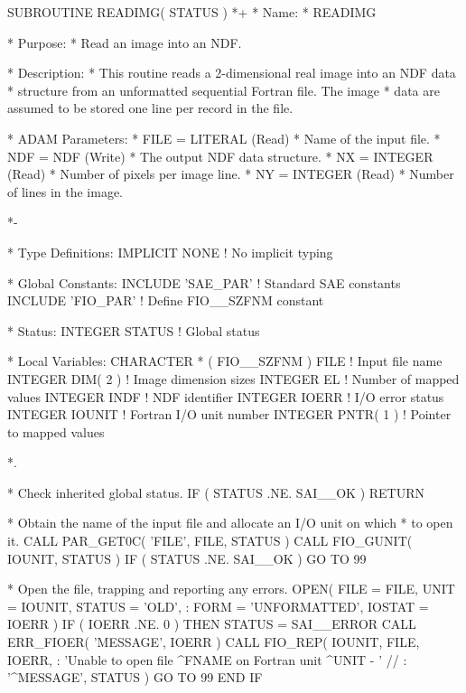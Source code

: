 \documentclass[twoside,11pt,nolof]{starlink}
\begin{document}
\small
\begin{terminalv}
      SUBROUTINE READIMG( STATUS )
*+
*  Name:
*     READIMG

*  Purpose:
*     Read an image into an NDF.

*  Description:
*     This routine reads a 2-dimensional real image into an NDF data
*     structure from an unformatted sequential Fortran file. The image
*     data are assumed to be stored one line per record in the file.

*  ADAM Parameters:
*     FILE = LITERAL (Read)
*        Name of the input file.
*     NDF = NDF (Write)
*        The output NDF data structure.
*     NX = INTEGER (Read)
*        Number of pixels per image line.
*     NY = INTEGER (Read)
*        Number of lines in the image.

*-

*  Type Definitions:
      IMPLICIT NONE              ! No implicit typing

*  Global Constants:
      INCLUDE 'SAE_PAR'          ! Standard SAE constants
      INCLUDE 'FIO_PAR'          ! Define FIO__SZFNM constant

*  Status:
      INTEGER STATUS             ! Global status

*  Local Variables:
      CHARACTER * ( FIO__SZFNM ) FILE ! Input file name
      INTEGER DIM( 2 )           ! Image dimension sizes
      INTEGER EL                 ! Number of mapped values
      INTEGER INDF               ! NDF identifier
      INTEGER IOERR              ! I/O error status
      INTEGER IOUNIT             ! Fortran I/O unit number
      INTEGER PNTR( 1 )          ! Pointer to mapped values

*.

*  Check inherited global status.
      IF ( STATUS .NE. SAI__OK ) RETURN

*  Obtain the name of the input file and allocate an I/O unit on which
*  to open it.
      CALL PAR_GET0C( 'FILE', FILE, STATUS )
      CALL FIO_GUNIT( IOUNIT, STATUS )
      IF ( STATUS .NE. SAI__OK ) GO TO 99

*  Open the file, trapping and reporting any errors.
      OPEN( FILE = FILE, UNIT = IOUNIT, STATUS = 'OLD',
     :      FORM = 'UNFORMATTED', IOSTAT = IOERR )
      IF ( IOERR .NE. 0 ) THEN
         STATUS = SAI__ERROR
         CALL ERR_FIOER( 'MESSAGE', IOERR )
         CALL FIO_REP( IOUNIT, FILE, IOERR,
     :   'Unable to open file ^FNAME on Fortran unit ^UNIT - ' //
     :   '^MESSAGE', STATUS )
         GO TO 99
      END IF


\end{terminalv}
\end{document}
